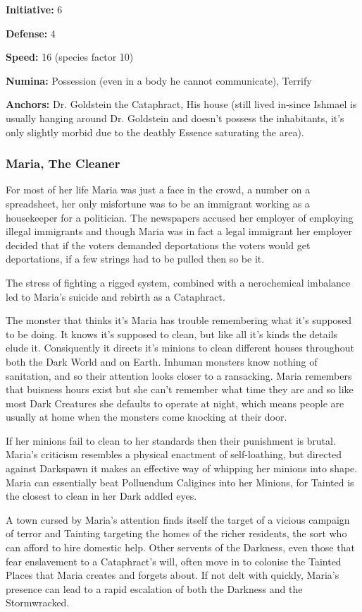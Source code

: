 \noindent \textbf{Initiative:} 6

\noindent \textbf{Defense:} 4

\noindent \textbf{Speed:} 16 (species factor 10)

\noindent \textbf{Numina:} Possession (even in a body he cannot communicate), Terrify

\noindent \textbf{Anchors:} Dr. Goldstein the Cataphract, His house (still lived in-since Ishmael is usually hanging around Dr. Goldstein and doesn't possess the inhabitants, it's only slightly morbid due to the deathly Essence saturating the area).

\subsubsection*{Maria, The Cleaner}

For most of her life Maria was just a face in the crowd, a number on a spreadsheet, her only misfortune was to be an immigrant working as a housekeeper for a politician. The newspapers accused her employer of employing illegal immigrants and though Maria was in fact a legal immigrant her employer decided that if the voters demanded deportations the voters would get deportations, if a few strings had to be pulled then so be it. 

The stress of fighting a rigged system, combined with a nerochemical imbalance led to Maria's suicide and rebirth as a Cataphract. 

The monster that thinks it's Maria has trouble remembering what it's supposed to be doing. It knows it's supposed to clean, but like all it's kinds the details elude it. Consiquently it directs it's minions to clean different houses throughout both the Dark World and on Earth. Inhuman monsters know nothing of sanitation, and so their attention looks closer to a ransacking. Maria remembers that buisness hours exist but she can't remember what time they are and so like most Dark Creatures she defaults to operate at night, which means people are usually at home when the monsters come knocking at their door.

If her minions fail to clean to her standards then their punishment is brutal. Maria's criticism resembles a physical enactment of self-loathing, but directed against Darkspawn it makes an effective way of whipping her minions into shape. Maria can essentially beat Polluendum Caligines into her Minions, for Tainted is the closest to clean in her Dark addled eyes. 

A town cursed by Maria's attention finds itself the target of a vicious campaign of terror and Tainting targeting the homes of the richer residents, the sort who can afford to hire domestic help. Other servents of the Darkness, even those that fear enslavement to a Cataphract's will, often move in to colonise the Tainted Places that Maria creates and forgets about. If not delt with quickly, Maria's presence can lead to a rapid escalation of both the Darkness and the Stormwracked. 

